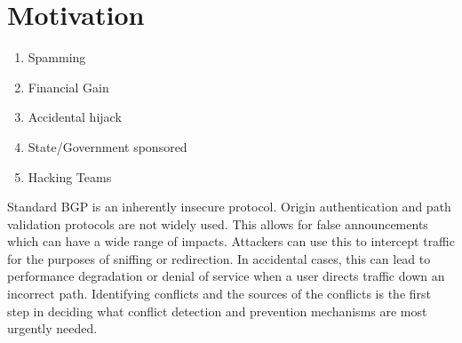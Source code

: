  \section{Motivation}\label{sec:motivation}
 

 \begin{enumerate}
 \item Spamming
 \item Financial Gain 
 \item Accidental hijack
 \item State/Government sponsored
 \item Hacking Teams
 \end{enumerate}
 

Standard BGP is an inherently insecure protocol. Origin authentication and path validation protocols are not widely used. This allows for false announcements which can have a wide range of impacts. Attackers can use this to intercept traffic for the purposes of sniffing or redirection. In accidental cases, this can lead to performance degradation or denial of service when a user directs traffic down an incorrect path. Identifying conflicts and the sources of the conflicts is the first step in deciding what conflict detection and prevention mechanisms are most urgently needed.

